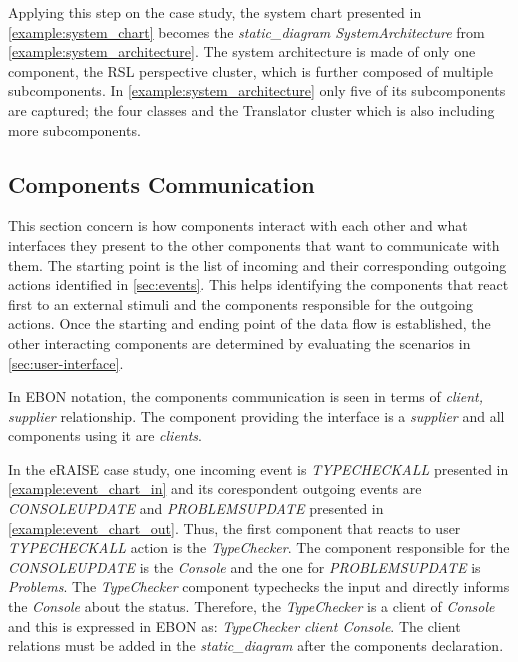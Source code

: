 \documentclass[conference]{IEEEtran}
\begin{document}
Applying this step on the case study, the system chart presented in
\autoref{example:system_chart} becomes the \emph{static\_diagram
SystemArchitecture} from
\autoref{example:system_architecture}. The system architecture is
made of only one component, the RSL perspective cluster, which is
further
composed of multiple subcomponents. In 
\autoref{example:system_architecture} only five of its subcomponents are
captured; the four classes and the Translator cluster which is also
including more subcomponents.


%
\subsection{Components Communication}
\label{sec:comp-comm}

This section concern is how components interact with each other and
what interfaces they present to the other components that want to
communicate with them. The starting point is the list of incoming and
their corresponding outgoing actions identified in
\autoref{sec:events}. This helps identifying the components that react
first to an external stimuli and the components responsible for the
outgoing actions. Once the starting and ending point of the data flow
is established, the other interacting components are determined by
evaluating the scenarios in \autoref{sec:user-interface}. 

In EBON notation, the components communication is seen in terms of
\emph{client, supplier} relationship.  The component providing the
interface is a \emph{supplier} and all components using it are
\emph{clients}.

In the eRAISE case study, one incoming event is \emph{TYPECHECKALL}
presented in \autoref{example:event_chart_in} and its corespondent
outgoing events are \emph{CONSOLEUPDATE} and \emph{PROBLEMSUPDATE}
presented in \autoref{example:event_chart_out}.  Thus, the first
component that reacts to user \emph{TYPECHECKALL} action is the
\emph{TypeChecker}. The component responsible for the
\emph{CONSOLEUPDATE} is the \emph{Console} and the one for
\emph{PROBLEMSUPDATE} is \emph{Problems}. The \emph{TypeChecker}
component typechecks the input and directly informs the \emph{Console}
about the status.  Therefore, the \emph{TypeChecker} is a client of
\emph{Console} and this is expressed in EBON as: \emph{ TypeChecker
  client Console}. The client relations must be added in
the \emph{static\_diagram} after the components declaration.
\end{document}
